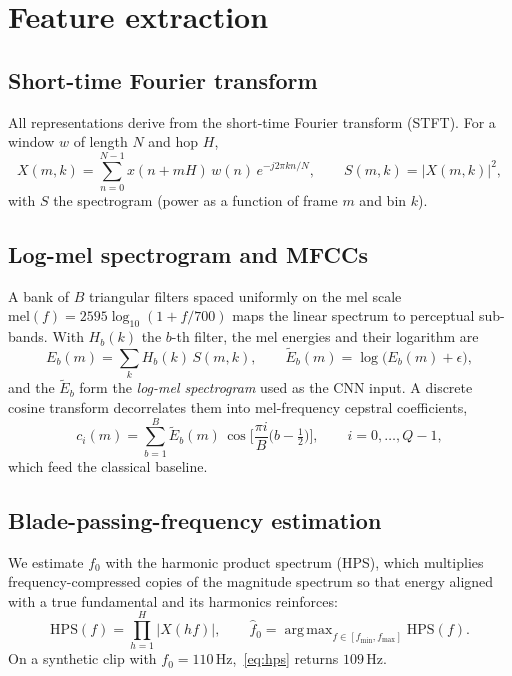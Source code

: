\documentclass[11pt]{article}
\DeclareMathOperator*{\argmax}{arg\,max}
\begin{document}
\section{Feature extraction}
\label{sec:features}
\subsection{Short-time Fourier transform}
All representations derive from the short-time Fourier transform (STFT). For a
window $w$ of length $N$ and hop $H$,
\begin{equation}
X(m,k) = \sum_{n=0}^{N-1} x(n+mH)\,w(n)\,e^{-j2\pi kn/N},
\qquad
S(m,k) = |X(m,k)|^2,
\end{equation}
with $S$ the spectrogram (power as a function of frame $m$ and bin $k$).

\subsection{Log-mel spectrogram and MFCCs}
A bank of $B$ triangular filters spaced uniformly on the mel scale
$\mathrm{mel}(f)=2595\log_{10}(1+f/700)$ maps the linear spectrum to perceptual
sub-bands. With $H_b(k)$ the $b$-th filter, the mel energies and their logarithm
are
\begin{equation}
E_b(m) = \sum_{k} H_b(k)\,S(m,k), \qquad
\tilde{E}_b(m) = \log\!\big(E_b(m)+\epsilon\big),
\end{equation}
and the $\tilde{E}_b$ form the \emph{log-mel spectrogram} used as the CNN input.
A discrete cosine transform decorrelates them into mel-frequency cepstral
coefficients,
\begin{equation}
c_i(m) = \sum_{b=1}^{B}\tilde{E}_b(m)\,
\cos\!\Big[\frac{\pi i}{B}\big(b-\tfrac12\big)\Big],
\qquad i=0,\dots,Q-1,
\end{equation}
which feed the classical baseline.

\subsection{Blade-passing-frequency estimation}
We estimate $f_0$ with the harmonic product spectrum (HPS), which multiplies
frequency-compressed copies of the magnitude spectrum so that energy aligned with
a true fundamental and its harmonics reinforces:
\begin{equation}
\mathrm{HPS}(f) = \prod_{h=1}^{H} \big|X(hf)\big|,
\qquad
\hat{f}_0 = \argmax_{f\in[f_{\min},f_{\max}]} \mathrm{HPS}(f).
\label{eq:hps}
\end{equation}
On a synthetic clip with $f_0=110$\,Hz,~\eqref{eq:hps} returns $109$\,Hz.
\end{document}
